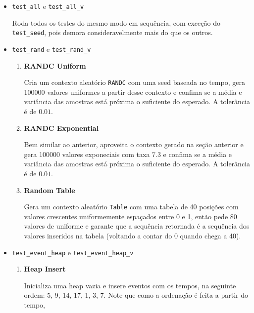 \documentclass[a4paper]{article}
\newcommand{\inlcode}{\texttt}
\begin{document}
\begin{itemize}
    \item \inlcode{test\_all} e \inlcode{test\_all\_v} \par
        Roda todos os testes do mesmo modo em sequência,
        com exceção do \inlcode{test\_seed},
        pois demora consideravelmente mais do que os outros.
    \item \inlcode{test\_rand} e \inlcode{test\_rand\_v} \par
        \begin{enumerate}
            \item \textbf{RANDC Uniform} \par
                Cria um contexto aleatório \inlcode{RANDC}
                com uma seed baseada no tempo,
                gera 100000 valores uniformes
                a partir desse contexto
                e confima se a média e variância das amostras
                está próxima o suficiente do esperado.
                A tolerância é de \(0.01\).
            \item \textbf{RANDC Exponential} \par
                Bem similar ao anterior,
                aproveita o contexto gerado na seção anterior
                e gera 100000 valores exponeciais com taxa \(7.3\)
                e confima se a média e variância das amostras
                está próxima o suficiente do esperado.
                A tolerância é de \(0.01\).
            \item \textbf{Random Table} \par
                Gera um contexto aleatório \inlcode{Table}
                com uma tabela de 40 posições com valores
                crescentes uniformemente espaçados entre 0 e 1,
                então pede 80 valores de uniforme e
                garante que a sequência retornada é
                a sequência dos valores inseridos na tabela
                (voltando a contar do 0 quando chega a 40).
        \end{enumerate}
    \item \inlcode{test\_event\_heap} e \inlcode{test\_event\_heap\_v}
        \begin{enumerate}
            \item \textbf{Heap Insert} \par
                Inicializa uma heap vazia e
                insere eventos com os tempos,
                na seguinte ordem: 5, 9, 14, 17, 1, 3, 7.
                Note que como a ordenação é feita a partir do tempo,

\end{enumerate}
\end{itemize}
\end{document}
